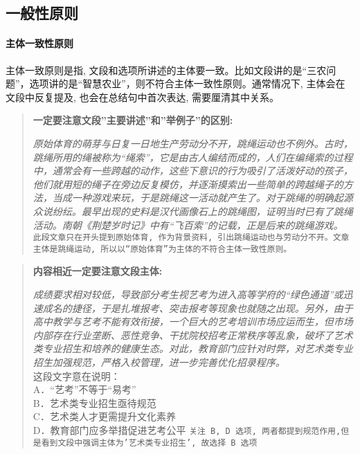 \subsection{一般性原则}

\paragraph{主体一致性原则}

主体一致原则是指, 文段和选项所讲述的主体要一致。比如文段讲的是“三农问题”，选项讲的是“智慧农业”，则不符合主体一致性原则。通常情况下, 主体会在文段中反复提及, 也会在总结句中首次表达, 需要厘清其中关系。

\begin{quote}
	\textbf{一定要注意文段''主要讲述''和''举例子''的区别:}
	\begin{tcolorbox}[colback=blue!5, colframe=blue!75!black, title=主体一致性案例1]
		\textit{原始体育的萌芽与日复一日地生产劳动分不开，跳绳运动也不例外。古时，跳绳所用的绳被称为“绳索”，它是由古人编结而成的，人们在编绳索的过程中，通常会有一些跨越的动作，这些下意识的行为吸引了活泼好动的孩子，他们就用短的绳子在旁边反复模仿，并逐渐摸索出一些简单的跨越绳子的方法，当成一种游戏来玩，于是跳绳这一活动就产生了。对于跳绳的明确起源众说纷纭。最早出现的史料是汉代画像石上的跳绳图，证明当时已有了跳绳活动。南朝《荆楚岁时记》中有“飞百索”的记载，正是后来的跳绳游戏。}
		\tcblower%
		\texttt{此段文章只在开头提到原始体育, 作为背景资料, 引出跳绳运动也与劳动分不开。文章主体是跳绳运动, 所以以“原始体育”为主体的不符合主体一致性原则。}
	\end{tcolorbox}
\end{quote}

\begin{quote}
	\textbf{内容相近一定要注意文段主体:}
	\begin{tcolorbox}[colback=blue!5, colframe=blue!75!black, title=主体一致原则案例2]
		\textit{成绩要求相对较低，导致部分考生视艺考为进入高等学府的“绿色通道”或迅速成名的捷径，于是扎堆报考、突击报考等现象也就随之出现。另外，由于高中教学与艺考不能有效衔接，一个巨大的艺考培训市场应运而生，但市场内部存在行业垄断、恶性竞争、干扰院校招考正常秩序等乱象，破坏了艺术类专业招生和培养的健康生态。对此，教育部门应针对时弊，对艺术类专业招生加强规范，严格入校管理，进一步完善优化招录程序。}\\
		这段文字意在说明：\\
		A．“艺考”不等于“易考”\\
		B．艺术类专业招生亟待规范\\
		C．艺术类人才更需提升文化素养\\
		D．教育部门应多举措促进艺考公平
		\tcblower%
		\texttt{关注 B, D 选项, 两者都提到规范作用,但是看到文段中强调主体为'艺术类专业招生', 故选择 B 选项}
	\end{tcolorbox}
\end{quote}


